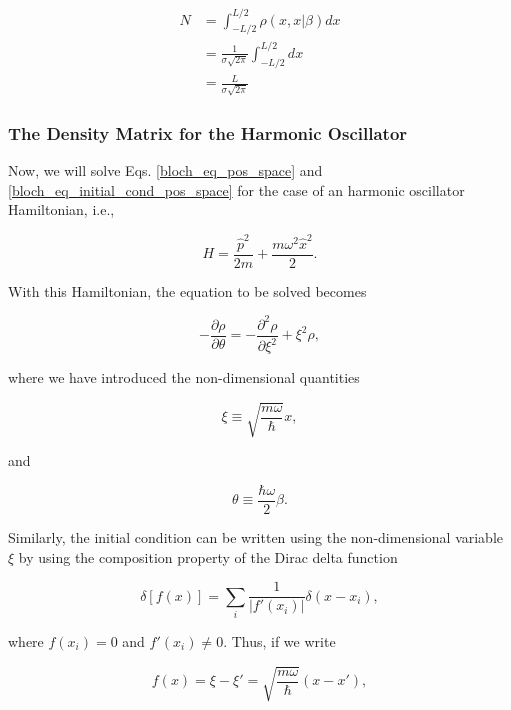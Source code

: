\documentclass{article}
\begin{document}
\begin{equation}
   \begin{split}
        N & = \int_{-L/2}^{L/2} \rho(x, x | \beta) dx \\ & = \frac{1}{\sigma \sqrt{2\pi}} \int_{-L/2}^{L/2} dx \\ & = \frac{L}{\sigma \sqrt{2\pi}}
   \end{split}
\end{equation}


\subsubsection{The Density Matrix for the Harmonic Oscillator}
Now, we will solve Eqs. \ref{bloch_eq_pos_space} and \ref{bloch_eq_initial_cond_pos_space} for the case of an harmonic oscillator Hamiltonian, i.e.,

\begin{equation}
    H = \frac{\hat{p}^{2}}{2m} + \frac{m \omega^{2} \hat{x}^{2}}{2}.
\end{equation}

With this Hamiltonian, the equation to be solved becomes

\begin{equation}\label{oscillator_pde}
    -\frac{\partial \rho}{\partial \theta} = -\frac{\partial^{2} \rho}{\partial \xi^{2}} + \xi^{2}\rho,
\end{equation}

where we have introduced the non-dimensional quantities

\begin{equation}
    \xi \equiv \sqrt{\frac{m \omega}{\hbar}} x,
\end{equation}

and

\begin{equation}
    \theta \equiv \frac{\hbar \omega}{2} \beta.
\end{equation}

Similarly, the initial condition can be written using the non-dimensional variable $\xi$ by using the composition property of the Dirac delta function

\begin{equation}
    \delta[f(x)] = \sum_{i}\frac{1}{|f'(x_{i})|} \delta(x-x_{i}),
\end{equation}

where $f(x_{i})=0$ and $f'(x_i)\neq0$. Thus, if we write

\begin{equation}
    f(x)=\xi-\xi'=\sqrt{\frac{m\omega}{\hbar}}(x-x'),
\end{equation}
\end{document}
